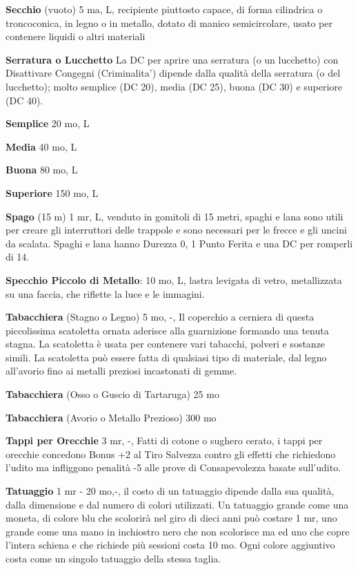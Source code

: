 \documentclass[a4paper,11pt,twoside,openany]{book}
\begin{document}
\textbf{Secchio} (vuoto) 5 ma, L, recipiente piuttosto capace, di forma cilindrica o troncoconica, in legno o in metallo, dotato di manico semicircolare, usato per contenere liquidi o altri materiali

\textbf{Serratura o Lucchetto} La DC per aprire una serratura (o un lucchetto) con Disattivare Congegni (Criminalita') dipende dalla qualità della serratura (o del lucchetto); molto semplice (DC 20), media (DC 25), buona (DC 30) e superiore (DC 40).

\textbf{Semplice} 20 mo, L

\textbf{Media} 40 mo, L

\textbf{Buona} 80 mo, L

\textbf{Superiore} 150 mo, L

\textbf{Spago} (15 m) 1 mr, L, venduto in gomitoli di 15 metri, spaghi e lana sono utili per creare gli interruttori delle trappole e sono necessari per le frecce e gli uncini da scalata. Spaghi e lana hanno Durezza 0, 1 Punto Ferita e una DC per romperli di 14.

\textbf{Specchio Piccolo di Metallo}: 10 mo, L, lastra levigata di vetro, metallizzata su una faccia, che riflette la luce e le immagini.

\textbf{Tabacchiera} (Stagno o Legno) 5 mo, -, Il coperchio a cerniera di questa piccolissima scatoletta ornata aderisce alla guarnizione formando una tenuta stagna. La scatoletta è usata per contenere vari tabacchi, polveri e sostanze simili. La scatoletta può essere fatta di qualsiasi tipo di materiale, dal legno all'avorio fino ai metalli preziosi incastonati di gemme.

\textbf{Tabacchiera} (Osso o Guscio di Tartaruga) 25 mo

\textbf{Tabacchiera} (Avorio o Metallo Prezioso) 300 mo

\textbf{Tappi per Orecchie} 3 mr, -, Fatti di cotone o sughero cerato, i tappi per orecchie concedono Bonus +2 al Tiro Salvezza contro gli effetti che richiedono l'udito ma infliggono penalità -5 alle prove di Consapevolezza basate sull'udito.

\textbf{Tatuaggio} 1 mr - 20 mo,-, il costo di un tatuaggio dipende dalla sua qualità, dalla dimensione e dal numero di colori utilizzati. Un tatuaggio grande come una moneta, di colore blu che scolorirà nel giro di dieci anni può costare 1 mr, uno grande come una mano in inchiostro nero che non scolorisce ma ed uno che copre l'intera schiena e che richiede più sessioni costa 10 mo.
Ogni colore aggiuntivo costa come un singolo tatuaggio della stessa taglia.
\end{document}
